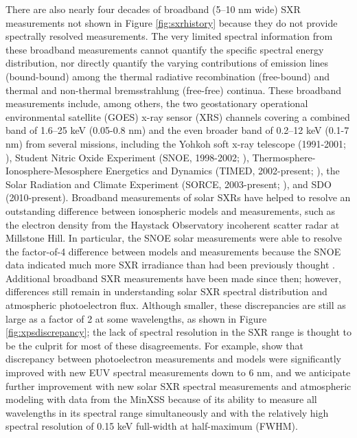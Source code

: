 There are also nearly four decades of broadband (5–10 nm wide) SXR measurements not shown in Figure \ref{fig:sxrhistory} because they do not provide spectrally resolved measurements. The very limited spectral information from these broadband measurements cannot quantify the specific spectral energy distribution, nor directly quantify the varying contributions of emission lines (bound-bound) among the thermal radiative recombination (free-bound) and thermal and non-thermal bremsstrahlung (free-free) continua. These broadband measurements include, among others, the two geostationary operational environmental satellite (GOES) x-ray sensor (XRS) channels covering a combined band of 1.6–25 keV (0.05-0.8 nm) and the even broader band of 0.2–12 keV (0.1-7 nm) from several missions, including the Yohkoh soft x-ray telescope (1991-2001; \citealt{Acton1999}), Student Nitric Oxide Experiment (SNOE, 1998-2002; \citealt{Bailey2000}), Thermosphere-Ionosphere-Mesosphere Energetics and Dynamics (TIMED, 2002-present; \citealt{Woods2005}), the Solar Radiation and Climate Experiment (SORCE, 2003-present; \citealt{Woods2005a}), and SDO (2010-present). Broadband measurements of solar SXRs have helped to resolve an outstanding difference between ionospheric models and measurements, such as the electron density from the Haystack Observatory incoherent scatter radar at Millstone Hill. In particular, the SNOE solar measurements were able to resolve the factor-of-4 difference between models and measurements because the SNOE data indicated much more SXR irradiance than had been previously thought \citep{Solomon2001}. Additional broadband SXR measurements have been made since then; however, differences still remain in understanding solar SXR spectral distribution and atmospheric photoelectron flux. Although smaller, these discrepancies are still as large as a factor of 2 at some wavelengths, as shown in Figure \ref{fig:xpsdiscrepancy}; the lack of spectral resolution in the SXR range is thought to be the culprit for most of these disagreements. For example, \citet{Peterson2009} show that discrepancy between photoelectron measurements and models were significantly improved with new EUV spectral measurements down to 6 nm, and we anticipate further improvement with new solar SXR spectral measurements and atmospheric modeling with data from the MinXSS because of its ability to measure all wavelengths in its spectral range simultaneously and with the relatively high spectral resolution of 0.15 keV full-width at half-maximum (FWHM).

